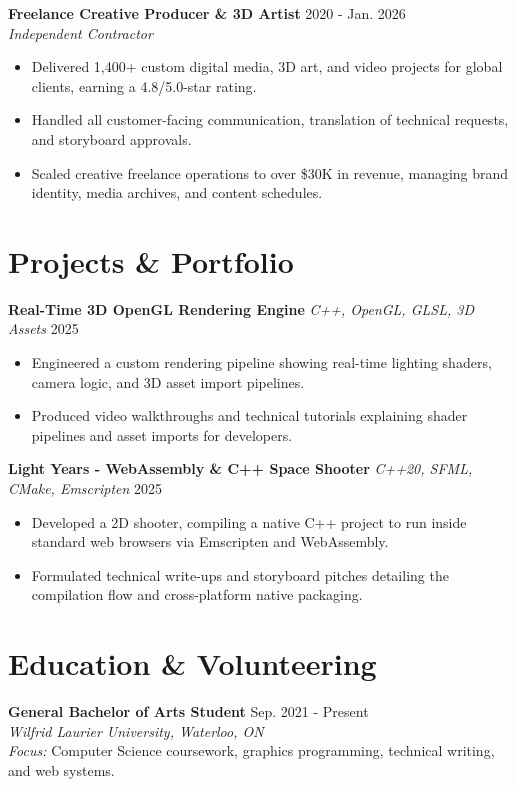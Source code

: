 \documentclass[a4paper,10pt]{article}
\begin{document}
\vspace{3pt}
\textbf{Freelance Creative Producer \& 3D Artist} \hfill 2020 - Jan. 2026 \\
\textit{Independent Contractor}
\begin{itemize}
    \item Delivered 1,400+ custom digital media, 3D art, and video projects for global clients, earning a 4.8/5.0-star rating.
    \item Handled all customer-facing communication, translation of technical requests, and storyboard approvals.
    \item Scaled creative freelance operations to over \$30K in revenue, managing brand identity, media archives, and content schedules.
\end{itemize}

\section*{Projects \& Portfolio}
\textbf{Real-Time 3D OpenGL Rendering Engine} \enspace\textbar\enspace \textit{C++, OpenGL, GLSL, 3D Assets} \hfill 2025 \\
\begin{itemize}
    \item Engineered a custom rendering pipeline showing real-time lighting shaders, camera logic, and 3D asset import pipelines.
    \item Produced video walkthroughs and technical tutorials explaining shader pipelines and asset imports for developers.
\end{itemize}

\vspace{3pt}
\textbf{Light Years - WebAssembly \& C++ Space Shooter} \enspace\textbar\enspace \textit{C++20, SFML, CMake, Emscripten} \hfill 2025 \\
\begin{itemize}
    \item Developed a 2D shooter, compiling a native C++ project to run inside standard web browsers via Emscripten and WebAssembly.
    \item Formulated technical write-ups and storyboard pitches detailing the compilation flow and cross-platform native packaging.
\end{itemize}

\section*{Education & Volunteering}
\textbf{General Bachelor of Arts Student} \hfill Sep. 2021 - Present \\
\textit{Wilfrid Laurier University, Waterloo, ON} \\
\textit{Focus:} Computer Science coursework, graphics programming, technical writing, and web systems.
\end{document}
